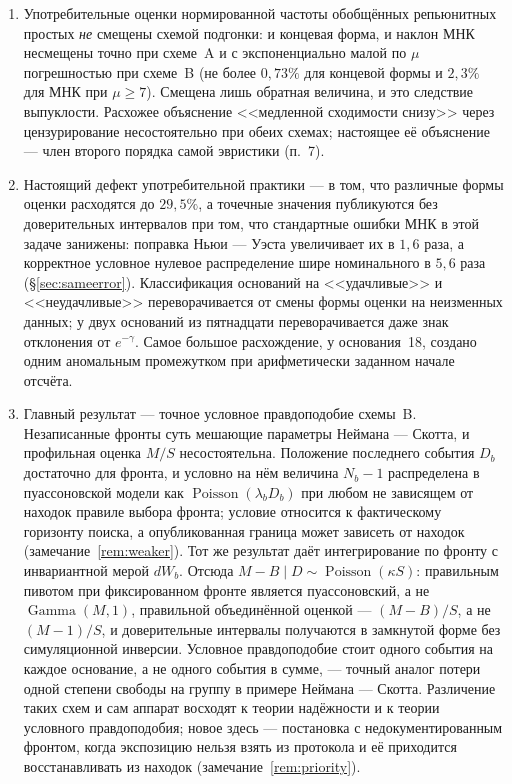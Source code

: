 \documentclass[11pt,a4paper]{article}
\theoremstyle{plain}
\theoremstyle{remark}
\newcommand{\emg}{e^{-\gamma}}
\DeclareMathOperator{\Gam}{Gamma}
\DeclareMathOperator{\Pois}{Poisson}
\begin{document}
\begin{enumerate}
\item Употребительные оценки нормированной частоты обобщённых репьюнитных простых
\emph{не} смещены схемой подгонки: и концевая форма, и наклон МНК несмещены точно при
схеме~A и с экспоненциально малой по $\mu$ погрешностью при схеме~B (не более
$0{,}73\%$ для концевой формы и $2{,}3\%$ для МНК при $\mu\ge7$).
Смещена лишь обратная величина, и это следствие выпуклости. Расхожее объяснение
<<медленной сходимости снизу>> через цензурирование несостоятельно при обеих схемах;
настоящее её объяснение --- член второго порядка самой эвристики (п.~7).

\item Настоящий дефект употребительной практики --- в том, что различные формы оценки
расходятся до $29{,}5\%$, а точечные значения публикуются без доверительных интервалов
при том, что стандартные ошибки МНК в этой задаче занижены: поправка Ньюи ---
Уэста увеличивает их в $1{,}6$ раза, а корректное условное нулевое распределение
шире номинального в $5{,}6$ раза (\S\ref{sec:sameerror}).
Классификация оснований на <<удачливые>> и <<неудачливые>> переворачивается от смены
формы оценки на неизменных данных; у двух оснований из пятнадцати переворачивается
даже знак отклонения от $\emg$. Самое большое расхождение, у основания~18, создано
одним аномальным промежутком при арифметически заданном начале отсчёта.

\item Главный результат --- точное условное правдоподобие схемы~B. Незаписанные
фронты суть мешающие параметры Неймана --- Скотта, и профильная оценка $M/S$
несостоятельна. Положение последнего события $D_b$ достаточно для фронта, и
условно на нём величина $N_b-1$ распределена в пуассоновской модели как
$\Pois(\lambda_bD_b)$ при любом не зависящем от находок правиле выбора фронта;
условие относится к фактическому горизонту поиска, а опубликованная граница может
зависеть от находок (замечание~\ref{rem:weaker}). Тот же результат даёт
интегрирование по фронту с инвариантной мерой $dW_b$. Отсюда $M-B\mid D\sim\Pois(\kappa S)$:
правильным пивотом при фиксированном фронте является пуассоновский, а не
$\Gam(M,1)$, правильной объединённой оценкой --- $(M-B)/S$, а не $(M-1)/S$, и
доверительные интервалы получаются в замкнутой форме без симуляционной инверсии.
Условное правдоподобие стоит одного события на каждое основание, а не одного
события в сумме, --- точный аналог потери одной степени свободы на группу в
примере Неймана --- Скотта. Различение таких схем и сам аппарат восходят к теории
надёжности и к теории условного правдоподобия; новое здесь --- постановка с
недокументированным фронтом, когда экспозицию нельзя взять из протокола и её
приходится восстанавливать из находок (замечание~\ref{rem:priority}).


\end{enumerate}
\end{document}
